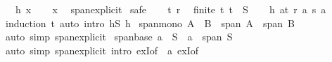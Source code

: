 \begin{isabellebody}
\ \ \ {\isachardoublequoteopen}h\ x{\isachardoublequoteclose}\isanewline
%
\isadelimproof
\ \ %
\endisadelimproof
%
\isatagproof
{}\isamarkupfalse%
\ x\ \isamarkupfalse%
\ span{\isacharunderscore}{\kern0pt}explicit\isanewline
{}\isamarkupfalse%
\ safe\isanewline
\ \ \isamarkupfalse%
\ t\ r\ \isamarkupfalse%
\ {\isachardoublequoteopen}finite\ t{\isachardoublequoteclose}\ {\isachardoublequoteopen}t\ {\isasymsubseteq}\ S{\isachardoublequoteclose}\ \isamarkupfalse%
\ \isamarkupfalse%
\ {\isachardoublequoteopen}h\ {\isacharparenleft}{\kern0pt}{\isasymSum}a{\isasymin}t{\isachardot}{\kern0pt}\ r\ a\ {\isacharasterisk}{\kern0pt}s\ a{\isacharparenright}{\kern0pt}{\isachardoublequoteclose}\isanewline
\ \ \ \ \isamarkupfalse%
\ {\isacharparenleft}{\kern0pt}induction\ t{\isacharparenright}{\kern0pt}\ {\isacharparenleft}{\kern0pt}auto\ intro{\isacharbang}{\kern0pt}{\isacharcolon}{\kern0pt}\ hS\ h{}{\isacharparenright}{\kern0pt}\isanewline
{}\isamarkupfalse%
%
\endisatagproof
{\isafoldproof}%
%
\isadelimproof
\isanewline
%
\endisadelimproof
\isanewline
{}\isamarkupfalse%
\ span{\isacharunderscore}{\kern0pt}mono{\isacharcolon}{\kern0pt}\ {\isachardoublequoteopen}A\ {\isasymsubseteq}\ B\ {\isasymLongrightarrow}\ span\ A\ {\isasymsubseteq}\ span\ B{\isachardoublequoteclose}\isanewline
%
\isadelimproof
\ \ %
\endisadelimproof
%
\isatagproof
{}\isamarkupfalse%
\ {\isacharparenleft}{\kern0pt}auto\ simp{\isacharcolon}{\kern0pt}\ span{\isacharunderscore}{\kern0pt}explicit{\isacharparenright}{\kern0pt}%
\endisatagproof
{\isafoldproof}%
%
\isadelimproof
\isanewline
%
\endisadelimproof
\isanewline
{}\isamarkupfalse%
\ span{\isacharunderscore}{\kern0pt}base{\isacharcolon}{\kern0pt}\ {\isachardoublequoteopen}a\ {\isasymin}\ S\ {\isasymLongrightarrow}\ a\ {\isasymin}\ span\ S{\isachardoublequoteclose}\isanewline
%
\isadelimproof
\ \ %
\endisadelimproof
%
\isatagproof
{}\isamarkupfalse%
\ {\isacharparenleft}{\kern0pt}auto\ simp{\isacharcolon}{\kern0pt}\ span{\isacharunderscore}{\kern0pt}explicit\ intro{\isacharbang}{\kern0pt}{\isacharcolon}{\kern0pt}\ exI{\isacharbrackleft}{\kern0pt}of\ {\isacharunderscore}{\kern0pt}\ {\isachardoublequoteopen}{\isacharbraceleft}{\kern0pt}a{\isacharbraceright}{\kern0pt}{\isachardoublequoteclose}{\isacharbrackright}{\kern0pt}\ exI{\isacharbrackleft}{\kern0pt}of\ {\isacharunderscore}{\kern0pt}\ {\isachardoublequoteopen}{\isasymlambda}{\isacharunderscore}{\kern0pt}{\isachardot}{\kern0pt}\ {}{\isachardoublequoteclose}{\isacharbrackright}{\kern0pt}{\isacharparenright}{\kern0pt}%

\end{isabellebody}
